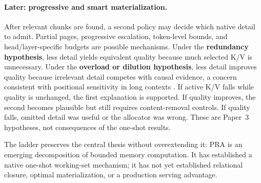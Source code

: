 \paragraph{Later: progressive and smart materialization.}
After relevant chunks are found, a second policy may decide which native detail to admit.
Partial pages, progressive escalation, token-level bounds, and head/layer-specific budgets are
possible mechanisms. Under the \textbf{redundancy hypothesis}, less detail yields equivalent
quality because much selected K/V is unnecessary. Under the \textbf{overload or dilution
hypothesis}, less detail improves quality because irrelevant detail competes with causal
evidence, a concern consistent with positional sensitivity in long contexts
\citep{liu2024lostmiddle}.
If active K/V falls while quality is unchanged, the first explanation is supported. If quality
improves, the second becomes plausible but still requires content-removal controls. If quality
falls, omitted detail was useful or the allocator was wrong. These are Paper~3 hypotheses,
not consequences of the one-shot results.

The ladder preserves the central thesis without overextending it: PRA is an emerging
decomposition of bounded memory computation. It has established a native one-shot working-set
mechanism; it has not yet established relational closure, optimal materialization, or a
production serving advantage.
